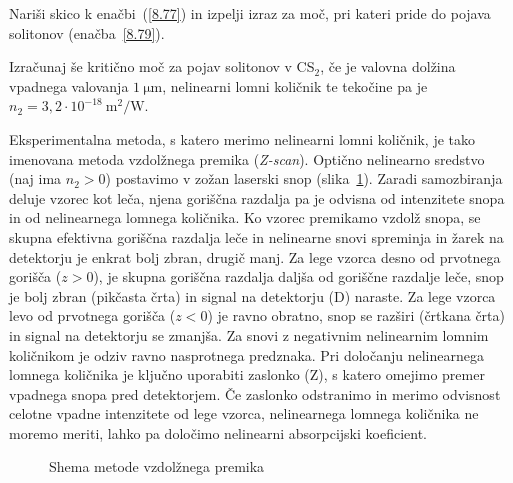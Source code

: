 \begin{definition}
Nariši skico k enačbi~(\ref{8.77}) in izpelji izraz za moč, pri kateri pride do pojava
solitonov (enačba~\ref{8.79}). 

Izračunaj še kritično moč za pojav solitonov v CS$_{2}$,
če je valovna dolžina vpadnega valovanja $1~\si{\micro\metre}$, 
nelinearni lomni količnik te tekočine pa je 
 $n_{2}=3,2 \cdot 10^{-18}~\si{\metre^2/\watt}$. 
\end{definition}

\begin{remark}
Eksperimentalna metoda, s katero merimo nelinearni lomni količnik, je tako imenovana
metoda vzdolžnega premika ({\it Z-scan}). Optično nelinearno sredstvo (naj ima $n_2>0$)
postavimo v zožan laserski snop (slika~\ref{fig:zscan}). 
Zaradi samozbiranja deluje vzorec kot leča, njena goriščna razdalja
pa je odvisna od intenzitete snopa in od nelinearnega lomnega količnika. Ko vzorec 
premikamo vzdolž snopa, se skupna efektivna goriščna razdalja leče in nelinearne snovi 
spreminja in žarek na detektorju je enkrat bolj zbran, drugič manj. 
Za lege vzorca desno od prvotnega gorišča ($z>0$), je skupna goriščna
razdalja daljša od goriščne razdalje leče, snop je bolj zbran (pikčasta črta) in signal 
na detektorju (D) naraste. Za lege vzorca levo
od prvotnega gorišča ($z<0$) je ravno obratno, snop se razširi (črtkana črta) in 
signal na detektorju se zmanjša. Za snovi z negativnim nelinearnim lomnim količnikom
je odziv ravno nasprotnega predznaka. Pri določanju nelinearnega lomnega količnika je
ključno uporabiti zaslonko (Z), s katero omejimo premer vpadnega snopa pred detektorjem. 
Če zaslonko odstranimo in merimo 
odvisnost celotne vpadne intenzitete od lege vzorca, nelinearnega lomnega količnika 
ne moremo meriti, lahko pa določimo nelinearni absorpcijski koeficient. 

\begin{figure}[h!]
\raggedleft 
\def\svgwidth{130truemm} 

\caption{Shema metode vzdolžnega premika}
\label{fig:zscan}
\end{figure}
\end{remark}

